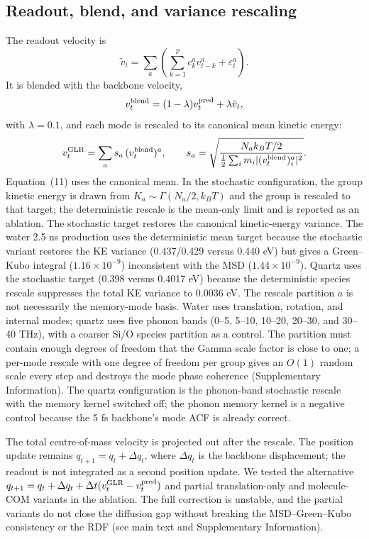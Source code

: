 \subsection{Readout, blend, and variance rescaling}

The readout velocity is
\begin{equation}
\tilde v_t=\sum_a\left(\sum_{k=1}^{p}c_k^a v_{t-k}^a+\varepsilon_t^a\right).
\end{equation}
It is blended with the backbone velocity,
\begin{equation}
v_t^{\rm blend}=(1-\lambda)v_t^{\rm pred}+\lambda\tilde v_t,
\end{equation}
with \(\lambda=0.1\), and each mode is rescaled to its canonical mean kinetic energy:
\begin{equation}
v_t^{\rm GLR}=\sum_a s_a\,(v_t^{\rm blend})^a,\qquad
s_a=\sqrt{\frac{N_a k_BT/2}
{\tfrac12\sum_i m_i|(v_t^{\rm blend})_i^a|^2}}.
\end{equation}
Equation~(11) uses the canonical mean. In the stochastic configuration, the group kinetic energy
is drawn from \(K_a\sim\Gamma(N_a/2,k_BT)\) and the group is rescaled to that target; the
deterministic rescale is the mean-only limit and is reported as an ablation. The stochastic target
restores the canonical kinetic-energy variance. The water 2.5 ns production uses the deterministic
mean target because the stochastic variant restores the KE variance (0.437/0.429 versus 0.440 eV)
but gives a Green--Kubo integral (\(1.16\times10^{-9}\)) inconsistent with the MSD
(\(1.44\times10^{-9}\)). Quartz uses the stochastic target (0.398 versus 0.4017 eV) because the
deterministic species rescale suppresses the total KE variance to 0.0036 eV. The rescale
partition \(a\) is not
necessarily the memory-mode basis. Water uses translation, rotation, and internal modes; quartz
uses five phonon bands (0--5, 5--10, 10--20, 20--30, and 30--40 THz), with a coarser Si/O species
partition as a control. The partition must contain enough degrees of freedom that the Gamma scale
factor is close to one; a per-mode rescale with one degree of freedom per group gives an
\(O(1)\) random scale every step and destroys the mode phase coherence (Supplementary
Information). The quartz configuration is the phonon-band stochastic rescale with the memory
kernel switched off; the phonon memory kernel is a negative control because the 5 fs backbone's
mode ACF is already correct.

The total centre-of-mass velocity is projected out after the rescale. The position update remains
\(q_{t+1}=q_t+\Delta q_t\), where \(\Delta q_t\) is the backbone displacement; the readout is not
integrated as a second position update. We tested the alternative
\(q_{t+1}=q_t+\Delta q_t+\Delta t(v_t^{\rm GLR}-v_t^{\rm pred})\) and partial
translation-only and molecule-COM variants in the ablation. The full correction is unstable, and
the partial variants do not close the diffusion gap without breaking the MSD--Green--Kubo
consistency or the RDF (see main text and Supplementary Information).

